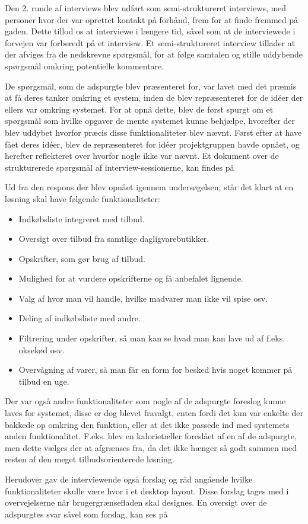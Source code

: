 Den 2. runde af interviews blev udført som semi-struktureret interviews, med personer hvor der var oprettet kontakt på forhånd, frem for at finde fremmed på gaden.
Dette tillod os at interviewe i længere tid, såvel som at de interviewede i forvejen var forberedt på et interview.
Et semi-struktureret interview tillader at der afviges fra de nedskrevne spørgsmål, for at følge samtalen og stille uddybende spørgsmål omkring potentielle kommentare.

De spørgsmål, som de adspurgte blev præsenteret for, var lavet med det præmis at få deres tanker omkring et system, inden de blev repræsenteret for de idéer der ellers var omkring systemet.
For at opnå dette, blev de først spurgt om et spørgsmål som hvilke opgaver de mente systemet kunne behjælpe, hvorefter der blev uddybet hvorfor præcis disse funktionaliteter blev nævnt.
Først efter at have fået deres idéer, blev de repræsenteret for idéer projektgruppen havde opnået, og herefter reflekteret over hvorfor nogle ikke var nævnt.
Et dokument over de strukturerede spørgsmål af interview-sessionerne, kan findes på \myref{}%

Ud fra den respons der blev opnået igennem undersøgelsen, står det klart at en løsning skal have følgende funktionaliteter:

\begin{itemize}
	\item Indkøbsliste integreret med tilbud.
	\item Oversigt over tilbud fra samtlige dagligvarebutikker.
	\item Opskrifter, som gør brug af tilbud.
	\item Mulighed for at vurdere opskrifterne og få anbefalet lignende.
	\item Valg af hvor man vil handle, hvilke madvarer man ikke vil spise osv.
	\item Deling af indkøbsliste med andre.
	\item Filtrering under opskrifter, så man kan se hvad man kan lave ud af f.eks. oksekød osv.
	\item Overvågning af varer, så man får en form for besked hvis noget kommer på tilbud en uge.
\end{itemize}

Der var også andre funktionaliteter som nogle af de adspurgte foreslog kunne laves for systemet, disse er dog blevet fravalgt, enten fordi det kun var enkelte der bakkede op omkring den funktion, eller at det ikke passede ind med systemets anden funktionalitet.
F.eks. blev en kalorietæller foreslået af en af de adspurgte, men dette vælges der at afgrænses fra, da det ikke hænger så godt sammen med resten af den meget tilbudsorienterede løsning.

Herudover gav de interviewende også forslag og råd angående hvilke funktionaliteter skulle være hvor i et desktop layout.
Disse forslag tages med i overvejelserne når brugergrænsefladen skal designes.
En oversigt over de adspurgtes svar såvel som forslag, kan ses på \myref{}%
